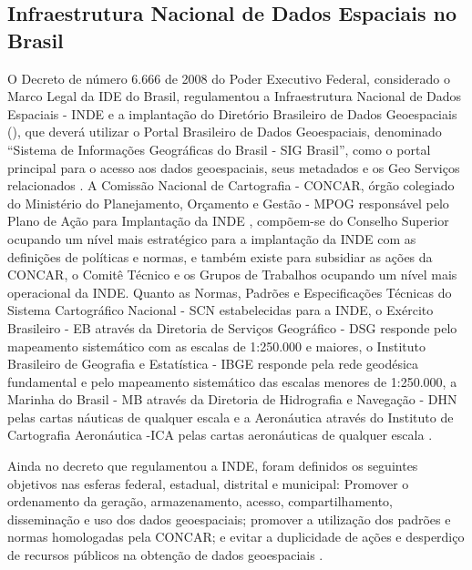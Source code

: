 \documentclass[preprint,authoryear,11pt]{elsarticle}
\begin{document}
\begin{multicols}{2}
\subsection{Infraestrutura Nacional de Dados Espaciais no Brasil}
\label{sec2}
O Decreto de número 6.666 de 2008 do Poder Executivo Federal, considerado o Marco Legal da IDE do Brasil, regulamentou a Infraestrutura Nacional de Dados Espaciais - INDE e a implantação do Diretório Brasileiro de Dados Geoespaciais (\citeauthor{dbdg}), que deverá utilizar o Portal Brasileiro de Dados Geoespaciais, denominado “Sistema de Informações Geográficas do Brasil - SIG Brasil”, como o portal principal para o acesso aos dados geoespaciais, seus metadados e  os Geo Serviços relacionados \citep{d6666}. A Comissão Nacional de Cartografia - CONCAR, órgão colegiado do Ministério do Planejamento, Orçamento e Gestão - MPOG responsável pelo Plano de Ação para Implantação da INDE \citep{concar}, compõem-se do Conselho Superior ocupando um nível mais estratégico para a implantação da INDE com as definições de políticas e normas, e também existe para subsidiar as ações da CONCAR, o Comitê Técnico e os Grupos de Trabalhos ocupando um nível mais operacional da INDE. Quanto as Normas, Padrões e Especificações Técnicas do Sistema Cartográfico Nacional - SCN estabelecidas para a INDE, o Exército Brasileiro - EB através da Diretoria de Serviços Geográfico - DSG responde pelo mapeamento sistemático com as escalas de 1:250.000 e maiores, o Instituto Brasileiro de Geografia e Estatística - IBGE responde pela rede geodésica fundamental e pelo mapeamento sistemático das escalas menores de 1:250.000, a Marinha do Brasil - MB através da Diretoria de Hidrografia e Navegação - DHN pelas cartas náuticas de qualquer escala e a Aeronáutica através do Instituto de Cartografia Aeronáutica -ICA  pelas cartas aeronáuticas de qualquer escala \citep{dl243}.    

Ainda no decreto que regulamentou a INDE, foram definidos os seguintes objetivos nas esferas federal, estadual, distrital e municipal: Promover o ordenamento da geração, armazenamento, acesso, compartilhamento, disseminação e uso dos dados geoespaciais; promover a utilização dos padrões e normas homologadas pela CONCAR; e evitar a duplicidade de ações e desperdiço de recursos públicos na obtenção de dados geoespaciais \citep{d6666}. 


\end{multicols}
\end{document}
